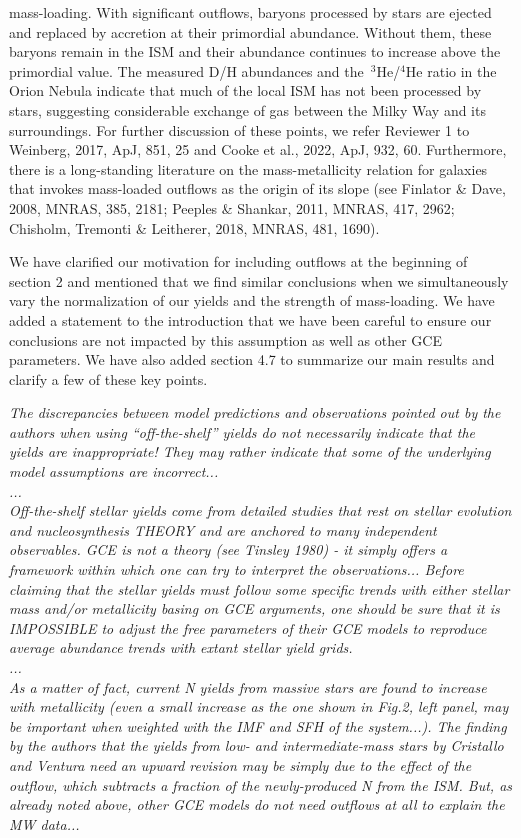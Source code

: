 \documentclass[12pt]{article}
\newcommand\doublebreak[0]{\par\null\par\noindent}
\begin{document}
mass-loading.
With significant outflows, baryons processed by stars are ejected and replaced
by accretion at their primordial abundance.
Without them, these baryons remain in the ISM and their abundance continues to
increase above the primordial value.
The measured D/H abundances and the~$^3$He/$^4$He ratio in the Orion Nebula
indicate that much of the local ISM has not been processed by stars, suggesting
considerable exchange of gas between the Milky Way and its surroundings.
For further discussion of these points, we refer Reviewer 1 to Weinberg, 2017,
ApJ, 851, 25 and Cooke et al., 2022, ApJ, 932, 60.
Furthermore, there is a long-standing literature on the mass-metallicity
relation for galaxies that invokes mass-loaded outflows as the origin of its
slope (see Finlator \& Dave, 2008, MNRAS, 385, 2181; Peeples \& Shankar, 2011,
MNRAS, 417, 2962; Chisholm, Tremonti \& Leitherer, 2018, MNRAS, 481, 1690).
\par
We have clarified our motivation for including outflows at the beginning of
section 2 and mentioned that we find similar conclusions when we simultaneously
vary the normalization of our yields and the strength of mass-loading.
We have added a statement to the introduction that we have been careful to
ensure our conclusions are not impacted by this assumption as well as other
GCE parameters.
We have also added section 4.7 to summarize our main results and clarify a few
of these key points.
\doublebreak
\textit{%
The discrepancies between model predictions and observations pointed out by the
authors when using ``off-the-shelf'' yields do not necessarily indicate that
the yields are inappropriate!
They may rather indicate that some of the underlying model assumptions are
incorrect...
\\
...
\\
Off-the-shelf stellar yields come from detailed studies that rest on stellar
evolution and nucleosynthesis THEORY and are anchored to many independent
observables.
GCE is not a theory (see Tinsley 1980) - it simply offers a framework within
which one can try to interpret the observations...
Before claiming that the stellar yields must follow some specific trends with
either stellar mass and/or metallicity basing on GCE arguments, one should be
sure that it is IMPOSSIBLE to adjust the free parameters of their GCE models to
reproduce average abundance trends with extant stellar yield grids.
\\
...
\\
As a matter of fact, current N yields from massive stars are found to increase
with metallicity (even a small increase as the one shown in Fig.2, left panel,
may be important when weighted with the IMF and SFH of the system...).
The finding by the authors that the yields from low- and intermediate-mass
stars by Cristallo and Ventura need an upward revision may be simply due to the
effect of the outflow, which subtracts a fraction of the newly-produced N from
the ISM. But, as already noted above, other GCE models do not need outflows at
all to explain the MW data...
}
\end{document}
